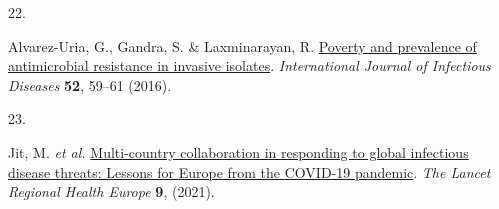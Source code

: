 \documentclass[
]{book}
\newlength{\cslhangindent}
\newlength{\csllabelwidth}
\newlength{\cslentryspacingunit} %
\newenvironment{CSLReferences}[2] %
 {%
  \setlength{\parindent}{0pt}
  \ifodd #1
  \let\oldpar\par
  \def\par{\hangindent=\cslhangindent\oldpar}
  \fi
  \setlength{\parskip}{#2\cslentryspacingunit}
 }%
 {}
\newcommand{\CSLLeftMargin}[1]{\parbox[t]{\csllabelwidth}{#1}}
\newcommand{\CSLRightInline}[1]{\parbox[t]{\linewidth - \csllabelwidth}{#1}\break}
\begin{document}
\begin{CSLReferences}{0}{0}
\leavevmode{}%
\CSLLeftMargin{22. }
\CSLRightInline{Alvarez-Uria, G., Gandra, S. \& Laxminarayan, R. \href{https://doi.org/10.1016/j.ijid.2016.09.026}{Poverty and prevalence of antimicrobial resistance in invasive isolates}. \emph{International Journal of Infectious Diseases} \textbf{52}, 59--61 (2016).}

\leavevmode{}%
\CSLLeftMargin{23. }
\CSLRightInline{Jit, M. \emph{et al.} \href{https://doi.org/10.1016/j.lanepe.2021.100221}{Multi-country collaboration in responding to global infectious disease threats: Lessons for {Europe} from the {COVID}-19 pandemic}. \emph{The Lancet Regional Health \textendash{} Europe} \textbf{9}, (2021).}

\end{CSLReferences}
\end{document}
